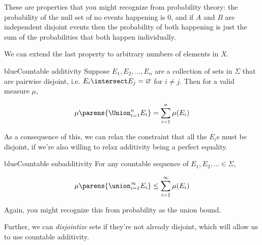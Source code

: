 \documentclass[../analysis.tex]{subfiles}
\begin{document}
    These are properties that you might recognize from probability theory: the probability of the null set of no events happening is 0, and if $A$ and $B$ are independent disjoint events then the probability of both happening is just the sum of the probabilities that both happen individually.

    We can extend the last property to arbitrary numbers of elements in $X$.

    \begin{mycolorbox}{blue}{Countable additivity}
        Suppose $E_1, E_2, \dots, E_n$ are a collection of sets in $\Sigma$ that are pairwise disjoint, i.e. $E_i \intersect E_j = \varnothing$ for $i \neq j$. Then for a valid measure $\mu$,

        \begin{align*}
            \mu\parens{\Union_{i=1}^n E_i} = \sum_{i=1}^n \mu(E_i)
        \end{align*}
    \end{mycolorbox}

    As a consequence of this, we can relax the constraint that all the $E_i$s must be disjoint, if we're also willing to relax additivity being a perfect equality.

    \begin{mycolorbox}{blue}{Countable subadditivity}
        For any countable sequence of $E_1, E_2, \dots \in \Sigma$, 

        \begin{align*}
            \mu\parens{\union_{i=1}^\infty E_i} \leq \sum_{i=1}^\infty \mu(E_i)
        \end{align*}
    \end{mycolorbox}

    Again, you might recognize this from probability as the union bound. 

    Further, we can \emph{disjointize} sets if they're not already disjoint, which will allow us to use countable additivity.
\end{document}
